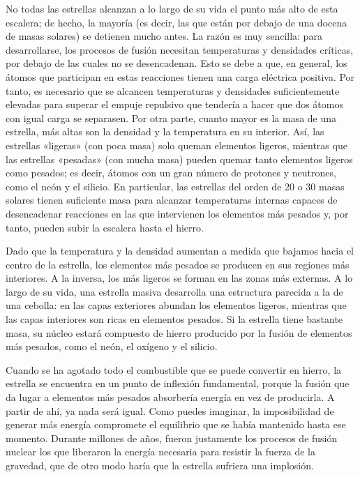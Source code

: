 No todas las estrellas alcanzan a lo largo de su vida el punto más alto de esta escalera; de hecho, la mayoría (es decir, las que están por debajo de una docena de masas solares) se detienen mucho antes. La razón es muy sencilla: para desarrollarse, los procesos de fusión necesitan temperaturas y densidades críticas, por debajo de las cuales no se desencadenan. Esto se debe a que, en general, los átomos que participan en estas reacciones tienen una carga eléctrica positiva. Por tanto, es necesario que se alcancen temperaturas y densidades suficientemente elevadas para superar el empuje repulsivo que tendería a hacer que dos átomos con igual carga se separasen. Por otra parte, cuanto mayor es la masa de una estrella, más altas son la densidad y la temperatura en su interior. Así, las estrellas «ligeras» (con poca masa) solo queman elementos ligeros, mientras que las estrellas «pesadas» (con mucha masa) pueden quemar tanto elementos ligeros como pesados; es decir, átomos con un gran número de protones y neutrones, como el neón y el silicio. En particular, las estrellas del orden de 20 o 30 masas solares tienen suficiente masa para alcanzar temperaturas internas capaces de desencadenar reacciones en las que intervienen los elementos más pesados y, por tanto, pueden subir la escalera hasta el hierro.

Dado que la temperatura y la densidad aumentan a medida que bajamos hacia el centro de la estrella, los elementos más pesados se producen en sus regiones más interiores. A la inversa, los más ligeros se forman en las zonas más externas. A lo largo de su vida, una estrella masiva desarrolla una estructura parecida a la de una cebolla: en las capas exteriores abundan los elementos ligeros, mientras que las capas interiores son ricas en elementos pesados. Si la estrella tiene bastante masa, su núcleo estará compuesto de hierro producido por la fusión de elementos más pesados, como el neón, el oxígeno y el silicio.

Cuando se ha agotado todo el combustible que se puede convertir en hierro, la estrella se encuentra en un punto de inflexión fundamental, porque la fusión que da lugar a elementos más pesados absorbería energía en vez de producirla. A partir de ahí, ya nada será igual. Como puedes imaginar, la imposibilidad de generar más energía compromete el equilibrio que se había mantenido hasta ese momento. Durante millones de años, fueron justamente los procesos de fusión nuclear los que liberaron la energía necesaria para resistir la fuerza de la gravedad, que de otro modo haría que la estrella sufriera una implosión.

